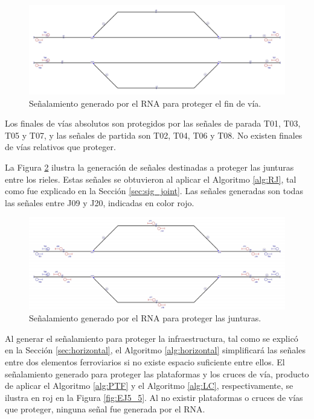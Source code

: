 	\begin{figure}[H]
		\centering
		\includegraphics[width=1\textwidth]{resultados-obtenidos/ejemplo5/images/5_step1.png}
		\centering\caption{Señalamiento generado por el RNA para proteger el fin de vía.}
		\label{fig:EJ5_3}
	\end{figure}
	
	Los finales de vías absolutos son protegidos por las señales de parada T01, T03, T05 y T07, y las señales de partida son T02, T04, T06 y T08. No existen finales de vías relativos que proteger.
	
	La Figura \ref{fig:EJ5_4} ilustra la generación de señales destinadas a proteger las junturas entre los rieles. Estas señales se obtuvieron al aplicar el Algoritmo \ref{alg:RJ}, tal como fue explicado en la Sección \ref{sec:sig_joint}. Las señales generadas son todas las señales entre J09 y J20, indicadas en color rojo.	
	
	\begin{figure}[H]
		\centering
		\includegraphics[width=1\textwidth]{resultados-obtenidos/ejemplo5/images/5_step2.png}
		\centering\caption{Señalamiento generado por el RNA para proteger las junturas.}
		\label{fig:EJ5_4}
	\end{figure}
	
	Al generar el señalamiento para proteger la infraestructura, tal como se explicó en la Sección \ref{sec:horizontal}, el Algoritmo \ref{alg:horizontal} simplificará las señales entre dos elementos ferroviarios si no existe espacio suficiente entre ellos. El señalamiento generado para proteger las plataformas y los cruces de vía, producto de aplicar el Algoritmo \ref{alg:PTF} y el Algoritmo \ref{alg:LC}, respectivamente, se ilustra en roj en la Figura \ref{fig:EJ5_5}. Al no existir plataformas o cruces de vías que proteger, ninguna señal fue generada por el RNA.
	
